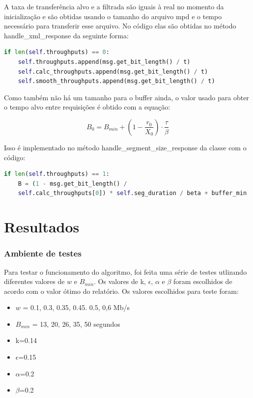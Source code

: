 \documentclass[10pt,twocolumn,letterpaper]{article}
\begin{document}
A taxa de transferência alvo e a filtrada são iguais à real no momento da inicialização e são obtidas usando o tamanho do arquivo mpd e o tempo necessário para transferir esse arquivo. No código elas são obtidas no método handle\_xml\_response da seguinte forma:

\begin{lstlisting}[language=python]
if len(self.throughputs) == 0:
	self.throughputs.append(msg.get_bit_length() / t)
	self.calc_throughputs.append(msg.get_bit_length() / t)
	self.smooth_throughputs.append(msg.get_bit_length() / t)
\end{lstlisting}

Como também não há um tamanho para o buffer ainda, o valor usado para obter o tempo alvo entre requisições é obtido com a equação:

\begin{equation}
	B_0 = B_{min} + (1 - \frac{r_0}{X_0}) \cdot \frac{\tau}{\beta}
\end{equation}

Isso é implementado no método handle\_segment\_size\_response da classe com o código:

\begin{lstlisting}[language=python]
	if len(self.throughputs) == 1:
	B = (1 - msg.get_bit_length() /
	self.calc_throughputs[0]) * self.seg_duration / beta + buffer_min
	\end{lstlisting}
	\section{Resultados}
	\subsubsection{Ambiente de testes}
	Para testar o funcionamento do algoritmo, foi feita uma série de testes utlizando diferentes valores de $w$ e $B_{min}$. Os valores de k, $\epsilon$, $\alpha$ e $\beta$ foram escolhidos de acordo com o valor ótimo do relatório. Os valores escolhidos para teste foram: 
	\begin{itemize}
		\item $w$ = 0.1, 0.3, 0.35, 0.45. 0.5, 0,6 Mb/s
		\item $B_{min}$  = 13, 20, 26, 35, 50 segundos
		\item k=0.14 
		\item $\epsilon$=0.15 
		\item $\alpha$=0.2
		\item $\beta$=0.2
	\end{itemize}
\end{document}
